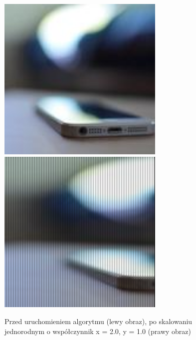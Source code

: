 \documentclass[a4paper,12pt]{book}
\begin{document}
\begin{figure}[H]
	\caption{Przed uruchomieniem algorytmu (lewy obraz), po skalowaniu jednorodnym o współczynnik x = 2.0, y = 1.0 (prawy obraz)}
	\includegraphics[width=8cm, height=8cm]{phone-unmodified.jpg}
	\includegraphics[width=8cm, height=8cm]{4-2/nonuniform-scaling-phone.png}
\end{figure}
\end{document}
